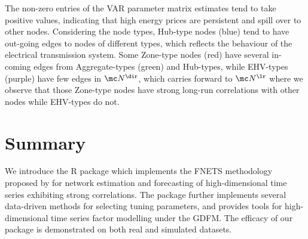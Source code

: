The non-zero entries of the VAR parameter matrix estimates tend to take positive values, indicating that high energy prices are persistent and spill over to other nodes.
Considering the node types, Hub-type nodes (blue) tend to have out-going edges to nodes of different types, which reflects the behaviour of the electrical transmission system.
Some Zone-type nodes (red) have several in-coming edges from Aggregate-types (green) and Hub-types, while EHV-types (purple) have few edges in $\mc N^{\dir}$, which carries forward to $\mc N^{\lr}$ where we observe that those Zone-type nodes have strong long-run correlations with other nodes while EHV-types do not.
 
\section{Summary}
\label{sec:summary}

We introduce the R package  which implements the FNETS methodology proposed by \cite{barigozzi2022fnets} for network estimation and forecasting of high-dimensional time series exhibiting strong correlations. 
The package further implements several data-driven methods for selecting tuning parameters, and provides tools for high-dimensional time series factor modelling under the GDFM. 
The efficacy of our package is demonstrated on both
real and simulated datasets.



\address{Dom Owens\\
  School of Mathematics, University of Bristol\\
  Supported by EPSRC Centre for Doctoral Training (EP/S023569/1)\\ %
  }
  
\address{Haeran Cho\\
  School of Mathematics, University of Bristol\\
  Supported by the Leverhulme Trust (RPG-2019-390)\\
  }

\address{Matteo Barigozzi\\
  Department of Economics, Universit\`a di Bologna\\
  Supported by MIUR (PRIN 2017, Grant 2017TA7TYC)\\
  }

\clearpage

\appendix

